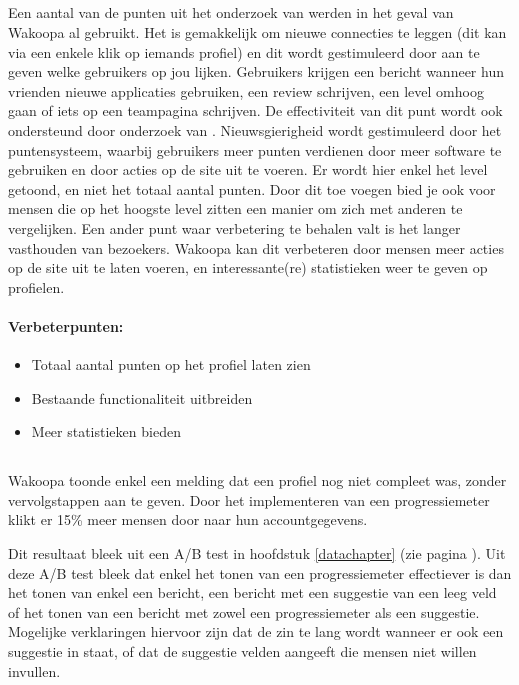 \documentclass[a4paper, 10pt, pdftex]{report}
\begin{document}
    \subsection{\cite{Berlanga2007}}
    Een aantal van de punten uit het onderzoek van \citeauthor{Berlanga2007} werden in het geval van Wakoopa al gebruikt. Het is gemakkelijk om nieuwe connecties te leggen (dit kan via een enkele klik op iemands profiel) en dit wordt gestimuleerd door aan te geven welke gebruikers op jou lijken. Gebruikers krijgen een bericht wanneer hun vrienden nieuwe applicaties gebruiken, een review schrijven, een level omhoog gaan of iets op een teampagina schrijven. De effectiviteit van dit punt wordt ook ondersteund door onderzoek van \cite{Berlanga2007}. Nieuwsgierigheid wordt gestimuleerd door het puntensysteem, waarbij gebruikers meer punten verdienen door meer software te gebruiken en door acties op de site uit te voeren. Er wordt hier enkel het level getoond, en niet het totaal aantal punten. Door dit toe voegen bied je ook voor mensen die op het hoogste level zitten een manier om zich met anderen te vergelijken. Een ander punt waar verbetering te behalen valt is het langer vasthouden van bezoekers. Wakoopa kan dit verbeteren door mensen meer acties op de site uit te laten voeren, en interessante(re) statistieken weer te geven op profielen.

      \paragraph{\textbf{Verbeterpunten:}}
      \begin{itemize}
        \item Totaal aantal punten op het profiel laten zien
        \item Bestaande functionaliteit uitbreiden
        \item Meer statistieken bieden
      \end{itemize}

    \subsection{\cite{Brouns2008}}
    \label{wak:Brouns2008}
    Wakoopa toonde enkel een melding dat een profiel nog niet compleet was, zonder vervolgstappen aan te geven. Door het implementeren van een progressiemeter klikt er 15\% meer mensen door naar hun accountgegevens.

    Dit resultaat bleek uit een A/B test in hoofdstuk \ref{datachapter} (zie pagina \pageref{profileprogress}). Uit deze A/B test bleek dat enkel het tonen van een progressiemeter effectiever is dan het tonen van enkel een bericht, een bericht met een suggestie van een leeg veld of het tonen van een bericht met zowel een progressiemeter als een suggestie. Mogelijke verklaringen hiervoor zijn dat de zin te lang wordt wanneer er ook een suggestie in staat, of dat de suggestie velden aangeeft die mensen niet willen invullen.
\end{document}
